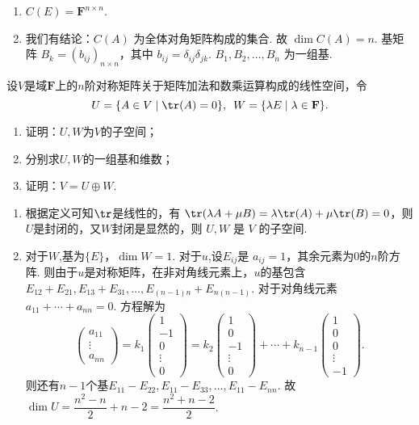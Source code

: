 \begin{exercise}
\begin{exgroup}
\begin{answer}
\begin{enumerate}
                \item $ C(E) = \mathbf{F}^{n \times n} $.

                \item 我们有结论：$ C(A) $ 为全体对角矩阵构成的集合. 故 $ \dim C(A) = n $. 基矩阵 $ B_k = (b_{ij})_{n \times n} $，其中 $ b_{ij} = \delta_{ij} \delta_{jk} $. $ B_1, B_2, \ldots, B_n $ 为一组基.
            \end{enumerate}
        \end{answer}

        \item 设$V$是域$\mathbf{F}$上的$n$阶对称矩阵关于矩阵加法和数乘运算构成的线性空间，令
        \[U=\{A\in V \mid \tr(A)=0\},\enspace W=\{\lambda E \mid \lambda\in\mathbf{F}\}.\]
        \begin{enumerate}
            \item 证明：$U,W$为$V$的子空间；

            \item 分别求$U,W$的一组基和维数；

            \item 证明：$V=U\oplus W$.
        \end{enumerate}
        \begin{answer}
            \begin{enumerate}
                \item 根据定义可知$\tr$是线性的，有 $\tr(\lambda A+\mu B)=\lambda\tr(A)+\mu\tr(B)=0$，则$U$是封闭的，又$W$封闭是显然的，则 $U,W$ 是 $V$ 的子空间.

                \item 对于$W$,基为$\{E\}$，$\dim W=1$. 对于$u$,设$E_{ij}$是 $a_{ij}=1$，其余元素为0的$n$阶方阵. 则由于$u$是对称矩阵，在非对角线元素上，$u$的基包含$E_{12}+E_{21},E_{13}+E_{31},\ldots ,E_{(n-1)n}+E_{n(n-1)}$. 对于对角线元素 $a_{11}+\cdots +a_{nn}=0$. 方程解为
                      \[\begin{pmatrix}a_{11}\\ \vdots\\ a_{nn}	\end{pmatrix}=k_1\begin{pmatrix}1 \\ -1 \\ 0\\ \vdots \\0	\end{pmatrix}=k_2\begin{pmatrix}1 \\ 0 \\ -1\\ \vdots \\0	\end{pmatrix}+\cdots+k_{n-1}\begin{pmatrix}1 \\ 0 \\ 0\\ \vdots \\-1	\end{pmatrix}.\]
                      则还有$n-1$个基$E_{11}-E_{22},E_{11}-E_{33},\ldots ,E_{11}-E_{nn}$. 故 $\dim U=\dfrac{n^2-n}2+n-2=\dfrac{n^2+n-2}2$.


\end{enumerate}
\end{answer}
\end{exgroup}
\end{exercise}
